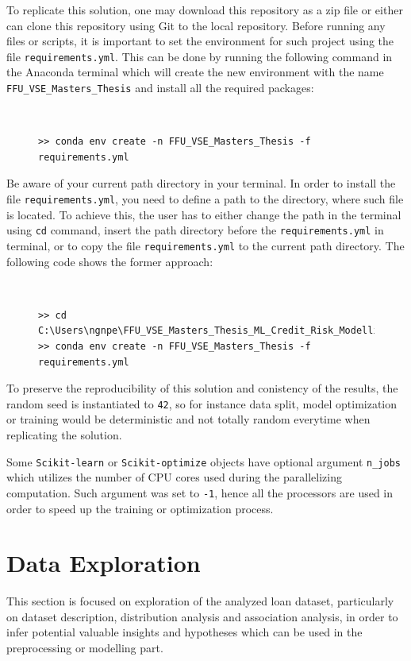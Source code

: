 To replicate this solution, one may download this repository as a zip file or either can clone this repository using Git to the local repository. Before running any files or scripts, it is important to set the environment for such project using the file \texttt{requirements.yml}. This can be done by running the following command in the Anaconda terminal which will create the new environment with the name \texttt{FFU\_VSE\_Masters\_Thesis} and install all the required packages:
\begin{figure}[H]
\centering\
{\footnotesize
\begin{verbatim}
>> conda env create -n FFU_VSE_Masters_Thesis -f requirements.yml    
\end{verbatim}
\vspace{-1em}
}
\end{figure}
Be aware of your current path directory in your terminal. In order to install the file \texttt{requirements.yml}, you need to define a path to the directory, where such file is located.
To achieve this, the user has to either change the path in the terminal using \texttt{cd} command, insert the path directory before the \texttt{requirements.yml} in terminal, or to copy the file \texttt{requirements.yml} to the current path directory. The following code shows the former approach:
\begin{figure}[H]
\centering\
{\footnotesize
\begin{verbatim}
>> cd C:\Users\ngnpe\FFU_VSE_Masters_Thesis_ML_Credit_Risk_Modelling
>> conda env create -n FFU_VSE_Masters_Thesis -f requirements.yml   
\end{verbatim}
\vspace{-1em}
}
\end{figure}


To preserve the reproducibility of this solution and conistency of the results, the random seed is instantiated to \texttt{42}, so for instance data split, model optimization or training would be deterministic and not totally random everytime when replicating the solution.

Some \lstinline{Scikit-learn} or \lstinline{Scikit-optimize} objects have optional argument \texttt{n\_jobs} which utilizes the number of CPU cores used during the parallelizing computation. Such argument was set to \texttt{-1}, hence all the processors are used in order to  speed up the training or optimization process.

\newpage
\section{Data Exploration}
This section is focused on exploration of the analyzed loan dataset, particularly on dataset description, distribution analysis and association analysis, in order to infer potential valuable insights and hypotheses which can be used in the preprocessing or modelling part.

